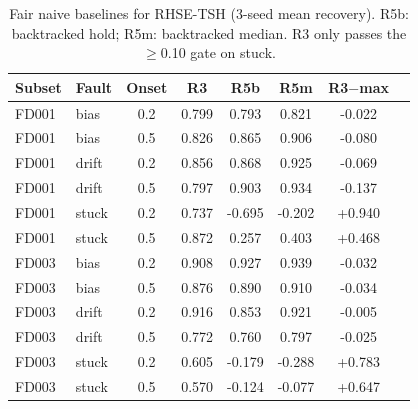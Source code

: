 \begin{table}[t]
\centering
\caption{Fair naive baselines for RHSE-TSH (3-seed mean recovery). R5b: backtracked
hold; R5m: backtracked median. R3 only passes the $\geq$0.10 gate on stuck.}
\label{tab:rhse}
\small
\begin{tabular}{llcccccc}
\toprule
Subset & Fault & Onset & R3 & R5b & R5m & R3$-$max \\
\midrule
FD001 & bias & 0.2 & 0.799 & 0.793 & 0.821 & -0.022 \\
FD001 & bias & 0.5 & 0.826 & 0.865 & 0.906 & -0.080 \\
FD001 & drift & 0.2 & 0.856 & 0.868 & 0.925 & -0.069 \\
FD001 & drift & 0.5 & 0.797 & 0.903 & 0.934 & -0.137 \\
FD001 & stuck & 0.2 & 0.737 & -0.695 & -0.202 & +0.940 \\
FD001 & stuck & 0.5 & 0.872 & 0.257 & 0.403 & +0.468 \\
FD003 & bias & 0.2 & 0.908 & 0.927 & 0.939 & -0.032 \\
FD003 & bias & 0.5 & 0.876 & 0.890 & 0.910 & -0.034 \\
FD003 & drift & 0.2 & 0.916 & 0.853 & 0.921 & -0.005 \\
FD003 & drift & 0.5 & 0.772 & 0.760 & 0.797 & -0.025 \\
FD003 & stuck & 0.2 & 0.605 & -0.179 & -0.288 & +0.783 \\
FD003 & stuck & 0.5 & 0.570 & -0.124 & -0.077 & +0.647 \\
\bottomrule
\end{tabular}
\end{table}
